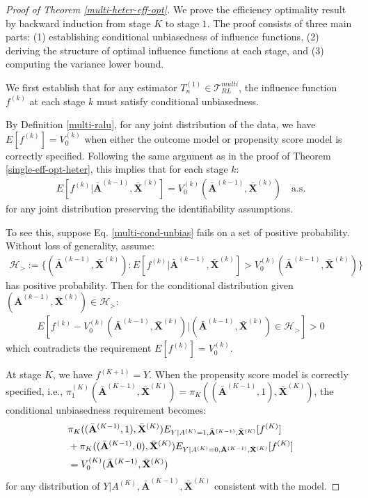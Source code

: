 \documentclass[11pt]{article}
\theoremstyle{referenceplain}
\theoremstyle{referencedefinition}
\theoremstyle{referenceremark}
\begin{document}
\begin{proof}[Proof of Theorem \ref{multi-heter-eff-opt}]
We prove the efficiency optimality result by backward induction from stage $K$ to stage $1$. The proof consists of three main parts: (1) establishing conditional unbiasedness of influence functions, (2) deriving the structure of optimal influence functions at each stage, and (3) computing the variance lower bound.

We first establish that for any estimator $T_n^{(1)} \in \mathcal{T}_{RL}^{multi}$, the influence function $f^{(k)}$ at each stage $k$ must satisfy conditional unbiasedness.

By Definition \ref{multi-ralu}, for any joint distribution of the data, we have $E[f^{(k)}] = V_0^{(k)}$ when either the outcome model or propensity score model is correctly specified. Following the same argument as in the proof of Theorem \ref{single-eff-opt-heter}, this implies that for each stage $k$:
\begin{align}\label{multi-cond-unbias}
    E[f^{(k)} | \bar{\mathbf{A}}^{(k-1)}, \bar{\mathbf{X}}^{(k)}] = V_0^{(k)}(\bar{\mathbf{A}}^{(k-1)}, \bar{\mathbf{X}}^{(k)}) \quad \text{a.s.}
\end{align}
for any joint distribution preserving the identifiability assumptions.

To see this, suppose Eq. \eqref{multi-cond-unbias} fails on a set of positive probability. Without loss of generality, assume:
\begin{align*}
    \mathcal{H}_> := \{(\bar{\mathbf{A}}^{(k-1)}, \bar{\mathbf{X}}^{(k)}): E[f^{(k)} | \bar{\mathbf{A}}^{(k-1)}, \bar{\mathbf{X}}^{(k)}] > V_0^{(k)}(\bar{\mathbf{A}}^{(k-1)}, \bar{\mathbf{X}}^{(k)})\}
\end{align*}
has positive probability. Then for the conditional distribution given $(\bar{\mathbf{A}}^{(k-1)}, \bar{\mathbf{X}}^{(k)}) \in \mathcal{H}_>$:
\begin{align*}
    E[f^{(k)} - V_0^{(k)}(\bar{\mathbf{A}}^{(k-1)}, \bar{\mathbf{X}}^{(k)}) | (\bar{\mathbf{A}}^{(k-1)}, \bar{\mathbf{X}}^{(k)}) \in \mathcal{H}_>] > 0
\end{align*}
which contradicts the requirement $E[f^{(k)}] = V_0^{(k)}$.

At stage $K$, we have $f^{(K+1)} = Y$. When the propensity score model is correctly specified, i.e., $\pi_1^{(K)}(\bar{\mathbf{A}}^{(K-1)}, \bar{\mathbf{X}}^{(K)}) = \pi_K((\bar{\mathbf{A}}^{(K-1)}, 1), \bar{\mathbf{X}}^{(K)})$, the conditional unbiasedness requirement becomes:
\begin{align}\label{multi-unbias-K}
    &\pi_K((\bar{\mathbf{A}}^{(K-1)}, 1), \bar{\mathbf{X}}^{(K)}) E_{Y|A^{(K)}=1, \bar{\mathbf{A}}^{(K-1)}, \bar{\mathbf{X}}^{(K)}}[f^{(K)}] \notag\\
    &+ \pi_K((\bar{\mathbf{A}}^{(K-1)}, 0), \bar{\mathbf{X}}^{(K)}) E_{Y|A^{(K)}=0, \bar{\mathbf{A}}^{(K-1)}, \bar{\mathbf{X}}^{(K)}}[f^{(K)}] \notag\\
    &= V_0^{(K)}(\bar{\mathbf{A}}^{(K-1)}, \bar{\mathbf{X}}^{(K)})
\end{align}
for any distribution of $Y | A^{(K)}, \bar{\mathbf{A}}^{(K-1)}, \bar{\mathbf{X}}^{(K)}$ consistent with the model.


\end{proof}
\end{document}

